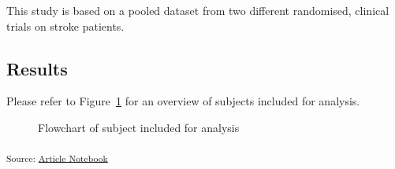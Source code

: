\documentclass[
  letterpaper,
  DIV=11,
  numbers=noendperiod]{scrartcl}
\begin{document}
This study is based on a pooled dataset from two different randomised,
clinical trials on stroke patients.

\subsection{Results}\label{results}

Please refer to Figure~\ref{fig-flowchart} for an overview of subjects
included for analysis.

\begin{figure}


\caption{\label{fig-flowchart}Flowchart of subject included for
analysis}

\end{figure}%

\textsubscript{Source:
\href{https://agdamsbo.github.io/svd-modification/index.qmd.html}{Article
Notebook}}
\end{document}
